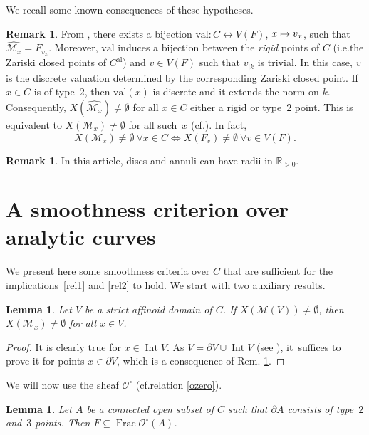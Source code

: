 \documentclass[10pt]{amsart}
\newcommand{\ie}{i.e.}
\newcommand{\cf}{cf.}
\newcommand{\mto}{\mathchoice{\longmapsto}{\mapsto}{\mapsto}{\mapsto}}
\newcommand{\al}{\mathrm{al}}
\newcommand{\val}{\mathrm{val}}
\DeclareMathOperator{\Frac}{Frac}
\DeclareMathOperator{\Int}{Int}
\newtheorem{lm}[thm]{Lemma}
\theoremstyle{definition}
\newtheorem{rem}[thm]{Remark}
\begin{document}
We recall some known consequences of these hypotheses.

\begin{rem} \label{1.2}
From \cite[Prop.\,3.15]{une}, there exists a bijection ${\val: C \leftrightarrow V(F)}$, ${x \mto v_x}$, such that $\widehat{\mathscr{M}_x}=F_{v_x}$. Moreover, $\val$ induces a bijection between the \emph{rigid} points of $C$ (\ie the Zariski closed points of $C^{\al}$) and $v \in V(F)$ such that $v_{|k}$ is trivial. In this case, $v$ is the discrete valuation determined by the corresponding Zariski closed point. If $x \in C$ is of type~$2$, then $\val(x)$ is discrete and it extends the norm on $k$.
Consequently, ${X(\widehat{\mathscr{M}_x}) \neq \emptyset}$ for all ${x \in C}$ either a rigid or type~$2$ point. This is equivalent to $X(\mathscr{M}_x) \neq \emptyset$ for all such~$x$ (\cf \cite[Cor.\,3.17]{une}). In fact,
\begin{equation} \label{artin}
X(\mathscr{M}_x) \neq \emptyset \ \forall x \in C
\iff X(F_v) \neq \emptyset \ \forall v \in V(F).
\end{equation}
\end{rem}

\begin{rem} \label{radii}
In this article, discs and annuli can have radii in $\mathbb{R}_{>0}$.
\end{rem}

\section{A smoothness criterion over analytic curves} \label{section1}

We present here some smoothness criteria over $C$ that are sufficient for the implications~\eqref{rel1} and \eqref{rel2} to hold. We start with two auxiliary results.

\begin{lm} \label{1.3bis}
Let $V$ be a strict affinoid domain of $C$. If $X(\mathscr{M}(V)) \neq \emptyset$, then ${X(\mathscr{M}_x) \neq \emptyset}$ for all $x \in V$.
\end{lm}

\begin{proof}
It is clearly true for $x \in \Int V$. As $V=\partial{V} \cup \Int V$ (see \cite[Cor.\,1.8.11]{doktoratura}), it~suffices to prove it for points $x \in \partial{V}$, which is a consequence of Rem. \ref{1.2}.
\end{proof}

We will now use the sheaf $\mathcal{O}^{\circ}$ (\cf relation \eqref{ozero}).
\begin{lm} \label{1.5.1}
Let $A$ be a connected open subset of $C$ such that $\partial{A}$ consists of type~$2$ and~$3$ points. Then $F \subseteq \Frac \mathcal{O}^{\circ}(A)$.
\end{lm}
\end{document}
